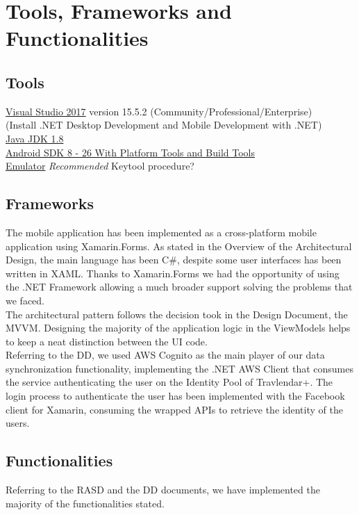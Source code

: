 \chapter{Tools, Frameworks and Functionalities}
\label{cha:framworks}

\section{Tools}
\label{sec:tools}
\href{https://www.visualstudio.com/downloads/}{Visual Studio 2017} version 15.5.2 (Community/Professional/Enterprise) \\(Install .NET Desktop Development and Mobile Development with .NET)\\
\href{http://www.oracle.com/technetwork/java/javase/downloads/jdk8-downloads-2133151.html}{Java JDK 1.8}\\
\href{https://developer.android.com/studio/releases/platform-tools.html}{Android SDK 8 - 26 With Platform Tools and Build Tools}\\
\href{https://developer.android.com/studio/releases/platform-tools.html}{Emulator} \textit{Recommended}
Keytool procedure?

\section{Frameworks}
The mobile application has been implemented as a cross-platform mobile application using Xamarin.Forms. As stated in the Overview of the Architectural Design, the main language has been C\#, despite some user interfaces has been written in XAML.
Thanks to Xamarin.Forms we had the opportunity of using the .NET Framework allowing a much broader support solving the problems that we faced.\\
The architectural pattern follows the decision took in the Design Document, the MVVM. Designing the majority of the application logic in the ViewModels helps to keep a neat distinction between the UI code.\\
Referring to the DD, we used AWS Cognito as the main player of our data synchronization functionality, implementing the .NET AWS Client that consumes the service authenticating the user on the Identity Pool of Travlendar+. 
The login process to authenticate the user has been implemented with the Facebook client for Xamarin, consuming the wrapped APIs to retrieve the identity of the users.

\section{Functionalities}
Referring to the RASD and the DD documents, we have implemented the majority of the functionalities stated.